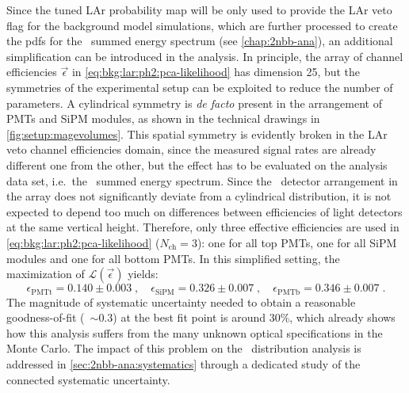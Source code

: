 Since the tuned LAr probability map will be only used to provide the LAr veto flag for the
background model simulations, which are further processed to create the pdfs for the
\bege\ summed energy spectrum (see \cref{chap:2nbb-ana}), an additional simplification can be
introduced in the analysis. In principle, the array of channel efficiencies
$\vec{\epsilon}$ in \cref{eq:bkg:lar:ph2:pca-likelihood} has dimension 25, but the
symmetries of the experimental setup can be exploited to reduce the number of parameters.
A cylindrical symmetry is \emph{de facto} present in the arrangement of PMTs and SiPM
modules, as shown in the technical drawings in \cref{fig:setup:magevolumes}. This spatial
symmetry is evidently broken in the LAr veto channel efficiencies domain, since the
measured signal rates are already different one from the other, but the effect has to be
evaluated on the analysis data set, i.e.~the \bege\ summed energy spectrum. Since the
\bege\ detector arrangement in the array does not significantly deviate from a cylindrical
distribution, it is not expected to depend too much on differences between efficiencies of
light detectors at the same vertical height. Therefore, only three effective efficiencies
are used in \cref{eq:bkg:lar:ph2:pca-likelihood} ($N_\text{ch}=3$): one for all top PMTs,
one for all SiPM modules and one for all bottom PMTs.  In this simplified setting, the
maximization of $\mathcal{L}(\vec{\epsilon})$ yields:
\begin{equation}\label{eq:bkg:lar:ph2:chan-eff}
  \epsilon_\text{PMTt} = 0.140 \pm 0.003 \;, \quad
  \epsilon_\text{SiPM} = 0.326 \pm 0.007 \;, \quad
  \epsilon_\text{PMTb} = 0.346 \pm 0.007 \;.
\end{equation}
The magnitude of systematic uncertainty needed to obtain a reasonable goodness-of-fit
(\pvalue~$\sim 0.3$) at the best fit point is around 30\%, which already shows
how this analysis suffers from the many unknown optical specifications in the Monte Carlo.
The impact of this problem on the \nnbb\ distribution analysis is addressed in
\cref{sec:2nbb-ana:systematics} through a dedicated study of the connected systematic
uncertainty.

